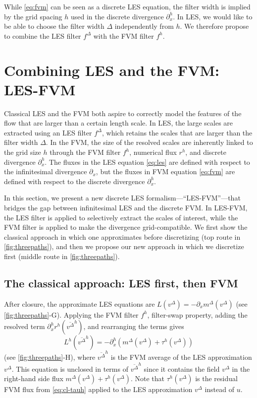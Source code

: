 \documentclass[preprint,twocolumn,5p]{elsarticle}
\begin{document}
While \cref{eq:fvm} can be seen as a discrete LES equation,
the filter width is implied by the grid spacing $h$ used in the discrete
divergence $\partial^h_x$. In LES, we would like to be able to choose the
filter width $\Delta$ independently from $h$. We therefore
propose to combine the LES filter $f^\Delta$ with the FVM filter $f^h$.


\section{Combining LES and the FVM: LES-FVM}
\label{sec:les-fvm}


Classical LES and the FVM both aspire to correctly model the features of the
flow that are larger than a certain length scale.
In LES, the large scales are extracted using an
LES filter $f^\Delta$,
which retains the scales that are larger than the filter width $\Delta$.
In the FVM, the size of the resolved scales are inherently linked to the grid
size $h$ through the FVM filter $f^h$,
numerical flux $r^h$, and discrete divergence $\partial^h_x$.
The fluxes in the LES equation \eqref{eq:les} are defined with respect to the
infinitesimal divergence $\partial_x$,
but the fluxes in FVM equation \eqref{eq:fvm} are
defined with respect to the discrete divergence $\partial^h_x$.

In this section, we present a new discrete LES
formalism---``LES-FVM''---that
bridges the gap between infinitesimal LES and the discrete FVM.
In LES-FVM, the LES filter is applied to selectively extract the scales of
interest, while the FVM filter is applied to make the divergence
grid-compatible.
We first show the classical approach in which one approximates before
discretizing (top route in \cref{fig:threepaths}), and then we propose our new
approach in which we discretize first (middle route in \cref{fig:threepaths}).

\subsection{The classical approach: LES first, then FVM}
\label{sec:cl-classical-discrete-les}

After closure, the approximate LES equations are
$L(v^\Delta) = - \partial_x m^\Delta(v^\Delta)$ (see \cref{fig:threepaths}-G).
Applying the FVM filter $f^h$,
filter-swap property,
adding the resolved term $\partial^h_x r^h(\overline{v^\Delta}^h)$,
and rearranging the terms gives
\begin{equation} \label{eq:classical-discrecte-les-exact}
    L^h\left(\overline{v^\Delta}^h\right) =
    - \partial^h_x \left( m^\Delta(v^\Delta) + \tau^h(v^\Delta) \right)
\end{equation}
(see \cref{fig:threepaths}-H),
where $\overline{v^\Delta}^h$ is the FVM average of the LES approximation
$v^\Delta$.
This equation is unclosed in terms of $\overline{v^\Delta}^h$ since
it contains the field $v^\Delta$ in the right-hand side flux
$m^\Delta(v^\Delta) + \tau^h(v^\Delta)$. Note that $\tau^h(v^\Delta)$ is the
residual FVM flux from \cref{eq:cl-tauh} applied to the LES
approximation $v^\Delta$ instead of $u$.
\end{document}
